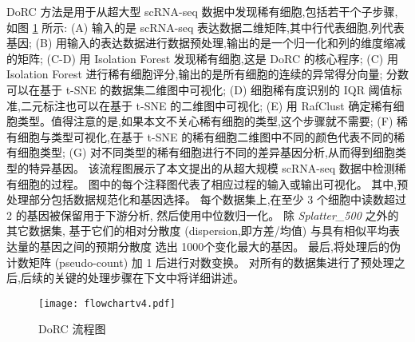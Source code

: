 DoRC 方法是用于从超大型 scRNA-seq 数据中发现稀有细胞,包括若干个子步骤,如图 \ref{fig:flowchart} 所示:
(A) 输入的是 scRNA-seq 表达数据二维矩阵,其中行代表细胞,列代表基因;
(B) 用输入的表达数据进行数据预处理,输出的是一个归一化和列的维度缩减的矩阵;
(C-D) 用 Isolation Forest 发现稀有细胞,这是 DoRC 的核心程序;
(C) 用 Isolation Forest 进行稀有细胞评分,输出的是所有细胞的连续的异常得分向量;
分数可以在基于 t-SNE 的数据集二维图中可视化;
(D) 细胞稀有度识别的 IQR 阈值标准,二元标注也可以在基于 t-SNE 的二维图中可视化;
(E) 用 RafClust 确定稀有细胞类型。值得注意的是,如果本文不关心稀有细胞的类型,这个步骤就不需要;
(F) 稀有细胞与类型可视化,在基于 t-SNE 的稀有细胞二维图中不同的颜色代表不同的稀有细胞类型;
(G) 对不同类型的稀有细胞进行不同的差异基因分析,从而得到细胞类型的特异基因。
该流程图展示了本文提出的从超大规模 scRNA-seq 数据中检测稀有细胞的过程。
图中的每个注释图代表了相应过程的输入或输出可视化。
其中,预处理部分包括数据规范化和基因选择。
每个数据集上,在至少 3 个细胞中读数超过 2 的基因被保留用于下游分析,
然后使用中位数归一化。
除 \textit{Splatter\_500} 之外的其它数据集,
基于它们的相对分散度 (dispersion,即方差/均值) 与具有相似平均表达量的基因之间的预期分散度 选出 1000个变化最大的基因。
最后,将处理后的伪计数矩阵 (pseudo-count) 加 1 后进行对数变换。
对所有的数据集进行了预处理之后,后续的关键的处理步骤在下文中将详细讲述。

\begin{figure}[!htbp]
    \centering
    \texttt{[image: flowchartv4.pdf]}
    \caption{DoRC 流程图
    }
    \label{fig:flowchart}
\end{figure}


